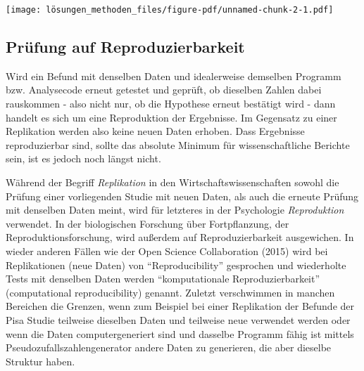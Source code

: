 \documentclass[
  letterpaper,
  DIV=11,
  numbers=noendperiod]{scrreprt}
\begin{document}
\texttt{[image: lösungen\_methoden\_files/figure-pdf/unnamed-chunk-2-1.pdf]}

\subsection{Prüfung auf
Reproduzierbarkeit}\label{pruxfcfung-auf-reproduzierbarkeit}

Wird ein Befund mit denselben Daten und idealerweise demselben Programm
bzw. Analysecode erneut getestet und geprüft, ob dieselben Zahlen dabei
rauskommen - also nicht nur, ob die Hypothese erneut bestätigt wird -
dann handelt es sich um eine Reproduktion der Ergebnisse. Im Gegensatz
zu einer Replikation werden also keine neuen Daten erhoben. Dass
Ergebnisse reproduzierbar sind, sollte das absolute Minimum für
wissenschaftliche Berichte sein, ist es jedoch noch längst nicht.

\begin{tcolorbox}[enhanced jigsaw, title=\textcolor{quarto-callout-important-color}{\faExclamation}\hspace{0.5em}{Begriffs-Wirrwarr}, colbacktitle=quarto-callout-important-color!10!white, rightrule=.15mm, titlerule=0mm, left=2mm, bottomrule=.15mm, arc=.35mm, leftrule=.75mm, toprule=.15mm, opacityback=0, breakable, bottomtitle=1mm, colframe=quarto-callout-important-color-frame, toptitle=1mm, opacitybacktitle=0.6, coltitle=black, colback=white]

Während der Begriff \emph{Replikation} in den Wirtschaftswissenschaften
sowohl die Prüfung einer vorliegenden Studie mit neuen Daten, als auch
die erneute Prüfung mit denselben Daten meint, wird für letzteres in der
Psychologie \emph{Reproduktion} verwendet. In der biologischen Forschung
über Fortpflanzung, der Reproduktionsforschung, wird außerdem auf
Reproduzierbarkeit ausgewichen. In wieder anderen Fällen wie der Open
Science Collaboration (2015) wird bei Replikationen (neue Daten) von
``Reproducibility'' gesprochen und wiederholte Tests mit denselben Daten
werden ``komputationale Reproduzierbarkeit'' (computational
reproducibility) genannt. Zuletzt verschwimmen in manchen Bereichen die
Grenzen, wenn zum Beispiel bei einer Replikation der Befunde der Pisa
Studie teilweise dieselben Daten und teilweise neue verwendet werden
oder wenn die Daten computergeneriert sind und dasselbe Programm fähig
ist mittels Pseudozufallszahlengenerator andere Daten zu generieren, die
aber dieselbe Struktur haben.

\end{tcolorbox}
\end{document}
